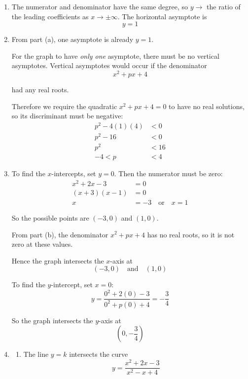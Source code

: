 \documentclass[leqno]{article}
\begin{document}
\begin{enumerate}[
  label=\textbf{\arabic*.},
  leftmargin=*,
  topsep=0pt,
  partopsep=0pt,
  parsep=0pt
]
\vspace*{10pt}

\begin{djsSolution}
\begin{enumerate}[label=\textbf{(\alph*)}]
  \item The numerator and denominator have the same degree, so \(y\to\) the ratio of the leading coefficients as \(x\to\pm\infty\). The horizontal asymptote is
  \[
  y=1
  \]

  \item From part (a), one asymptote is already $y=1$.

  For the graph to have \emph{only one} asymptote, there must be no vertical asymptotes. Vertical asymptotes would occur if the denominator
  \[
  x^2+px+4
  \]

  had any real roots.

  Therefore we require the quadratic $x^2+px+4=0$ to have no real solutions, so its discriminant must be negative:
  \begin{align*}
  p^2-4(1)(4)&<0\\
  p^2-16&<0\\
  p^2&<16\\
  -4<p&<4
  \end{align*}

  \item To find the $x$-intercepts, set $y=0$. Then the numerator must be zero:
  \begin{align*}
  x^2+2x-3&=0\\
  (x+3)(x-1)&=0\\
  x&=-3 \quad \text{or} \quad x=1
  \end{align*}

  So the possible points are $(-3,0)$ and $(1,0)$.

  From part (b), the denominator $x^2+px+4$ has no real roots, so it is not zero at these values.

  Hence the graph intersects the $x$-axis at
  \[
  (-3,0)\quad \text{and}\quad (1,0)
  \]

  To find the $y$-intercept, set $x=0$:
  \[
  y=\frac{0^2+2(0)-3}{0^2+p(0)+4}=-\frac34
  \]

  So the graph intersects the $y$-axis at
  \[
  \left(0,-\frac34\right)
  \]

  \item 
  \begin{enumerate}[label=(\roman*)]
    \item The line $y=k$ intersects the curve
    \[
    y=\frac{x^2+2x-3}{x^2-x+4}
    \]


\end{enumerate}
\end{enumerate}
\end{djsSolution}
\end{enumerate}
\end{document}
